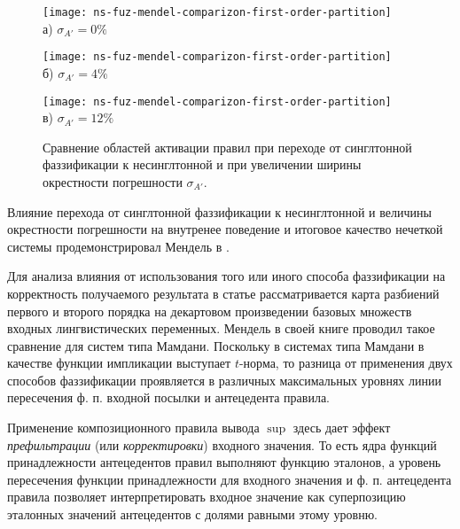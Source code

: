 \begin{figure}[ht]
	\begin{minipage}[b][][b]{0.3\linewidth}
		\centering
		\texttt{[image: ns-fuz-mendel-comparizon-first-order-partition]} \\ а) $\sigma_{A'} = 0\%$
	\end{minipage}
	\hfill
	\begin{minipage}[b][][b]{0.3\linewidth}
		\centering
		\texttt{[image: ns-fuz-mendel-comparizon-first-order-partition]} \\ б) $\sigma_{A'} = 4\%$
	\end{minipage}
	\hfill
	\begin{minipage}[b][][b]{0.3\linewidth}
		\centering
		\texttt{[image: ns-fuz-mendel-comparizon-first-order-partition]} \\ в)  $\sigma_{A'} = 12\%$
	\end{minipage}

    \caption{Сравнение областей активации правил при переходе от синглтонной фаззификации к несинглтонной и при увеличении ширины окрестности погрешности $\sigma_{A'}$.}
\end{figure}

Влияние перехода от синглтонной фаззификации к несинглтонной и величины окрестности погрешности на внутренее поведение и итоговое качество нечеткой системы продемонстрировал Мендель в \cite{Mendel2021, Mendel2017}. 

Для анализа влияния от использования того или иного способа фаззификации на корректность получаемого результата в статье \cite{Mendel2020} рассматривается карта разбиений первого и второго порядка на декартовом произведении базовых множеств входных лингвистических переменных. Мендель в своей книге проводил такое сравнение для систем типа Мамдани. Поскольку в системах типа Мамдани в качестве функции импликации выступает $t$-норма, то разница от применения двух способов фаззификации проявляется в различных максимальных уровнях линии пересечения ф. п. входной посылки и антецедента правила. %

Применение композиционного правила вывода $\sup$ здесь дает эффект \textit{префильтрации} (или \textit{корректировки}) входного значения. То есть ядра функций принадлежности антецедентов правил выполняют функцию эталонов, а уровень пересечения функции принадлежности для входного значения и ф. п. антецедента правила позволяет интерпретировать входное значение как суперпозицию эталонных значений антецедентов с долями равными этому уровню.

